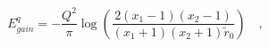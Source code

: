 \begin{equation}
E^q_{gain} = -
\frac{Q^2}{\pi}\log{\left(\frac{2(x_1-1)(x_2-1)}{(x_1+1)(x_2+1)\tilde{r}_0}\right)}\quad,
\end{equation}

